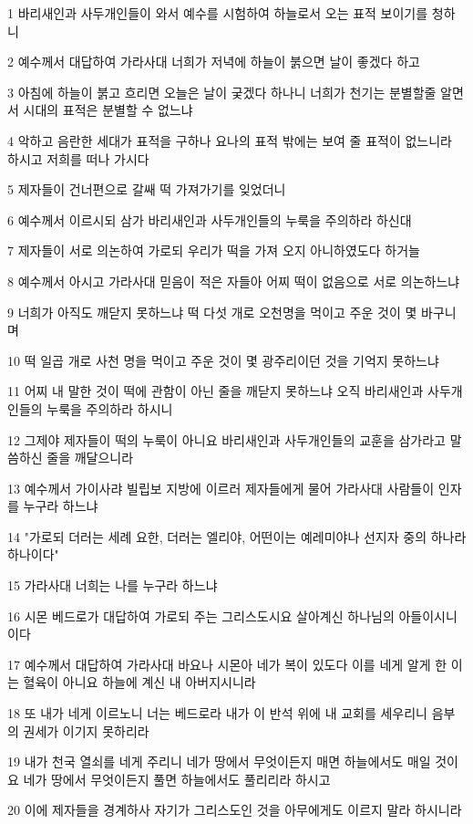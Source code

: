 \par 1 바리새인과 사두개인들이 와서 예수를 시험하여 하늘로서 오는 표적 보이기를 청하니
\par 2 예수께서 대답하여 가라사대 너희가 저녁에 하늘이 붉으면 날이 좋겠다 하고
\par 3 아침에 하늘이 붉고 흐리면 오늘은 날이 궂겠다 하나니 너희가 천기는 분별할줄 알면서 시대의 표적은 분별할 수 없느냐
\par 4 악하고 음란한 세대가 표적을 구하나 요나의 표적 밖에는 보여 줄 표적이 없느니라 하시고 저희를 떠나 가시다
\par 5 제자들이 건너편으로 갈쌔 떡 가져가기를 잊었더니
\par 6 예수께서 이르시되 삼가 바리새인과 사두개인들의 누룩을 주의하라 하신대
\par 7 제자들이 서로 의논하여 가로되 우리가 떡을 가져 오지 아니하였도다 하거늘
\par 8 예수께서 아시고 가라사대 믿음이 적은 자들아 어찌 떡이 없음으로 서로 의논하느냐
\par 9 너희가 아직도 깨닫지 못하느냐 떡 다섯 개로 오천명을 먹이고 주운 것이 몇 바구니며
\par 10 떡 일곱 개로 사천 명을 먹이고 주운 것이 몇 광주리이던 것을 기억지 못하느냐
\par 11 어찌 내 말한 것이 떡에 관함이 아닌 줄을 깨닫지 못하느냐 오직 바리새인과 사두개인들의 누룩을 주의하라 하시니
\par 12 그제야 제자들이 떡의 누룩이 아니요 바리새인과 사두개인들의 교훈을 삼가라고 말씀하신 줄을 깨달으니라
\par 13 예수께서 가이사랴 빌립보 지방에 이르러 제자들에게 물어 가라사대 사람들이 인자를 누구라 하느냐
\par 14 "가로되 더러는 세례 요한, 더러는 엘리야, 어떤이는 예레미야나 선지자 중의 하나라 하나이다"
\par 15 가라사대 너희는 나를 누구라 하느냐
\par 16 시몬 베드로가 대답하여 가로되 주는 그리스도시요 살아계신 하나님의 아들이시니이다
\par 17 예수께서 대답하여 가라사대 바요나 시몬아 네가 복이 있도다 이를 네게 알게 한 이는 혈육이 아니요 하늘에 계신 내 아버지시니라
\par 18 또 내가 네게 이르노니 너는 베드로라 내가 이 반석 위에 내 교회를 세우리니 음부의 권세가 이기지 못하리라
\par 19 내가 천국 열쇠를 네게 주리니 네가 땅에서 무엇이든지 매면 하늘에서도 매일 것이요 네가 땅에서 무엇이든지 풀면 하늘에서도 풀리리라 하시고
\par 20 이에 제자들을 경계하사 자기가 그리스도인 것을 아무에게도 이르지 말라 하시니라
